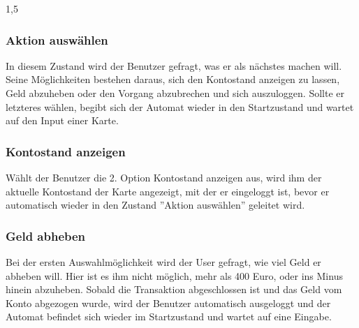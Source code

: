 \documentclass[a4paper]{article}
\begin{document}
\begin{spacing}{1,5}
\subsubsection{Aktion auswählen}

In diesem Zustand wird der Benutzer gefragt, was er als nächstes machen will. Seine Möglichkeiten bestehen daraus, sich den Kontostand anzeigen zu lassen, Geld abzuheben oder den Vorgang abzubrechen und sich auszuloggen. Sollte er letzteres wählen, begibt sich der Automat wieder in den Startzustand und wartet auf den Input einer Karte.

\subsubsection{Kontostand anzeigen}

Wählt der Benutzer die 2. Option Kontostand anzeigen aus, wird ihm der aktuelle Kontostand der Karte angezeigt, mit der er eingeloggt ist, bevor er automatisch wieder in den Zustand ''Aktion auswählen'' geleitet wird.

\subsubsection{Geld abheben}

Bei der ersten Auswahlmöglichkeit wird der User gefragt, wie viel Geld er abheben will. Hier ist es ihm nicht möglich, mehr als 400 Euro, oder ins Minus hinein abzuheben. Sobald die Transaktion abgeschlossen ist und das Geld vom Konto abgezogen wurde, wird der Benutzer automatisch ausgeloggt und der Automat befindet sich wieder im Startzustand und wartet auf eine Eingabe.

\end{spacing}
\end{document}
